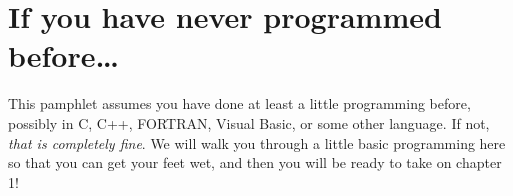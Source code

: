 \chapter*{If you have never programmed before\ldots}
\label{chap:Prelim}

This pamphlet assumes you have done at least a little programming before, possibly in C, C++, FORTRAN, Visual Basic, or some other language. If not, \emph{that is completely fine}. We will walk you through a little basic programming here so that you can get your feet wet, and then you will be ready to take on chapter 1!
